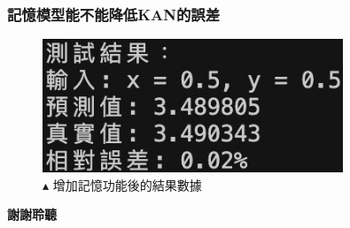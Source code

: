 \documentclass{beamer}
\begin{document}
\begin{frame}
    \frametitle{記憶模型能不能降低KAN的誤差}
    \begin{figure}
        \centering
        \begin{minipage}{\textwidth}
            \includegraphics[width=0.8\textwidth,keepaspectratio]{figures/增加記憶功能後的結果.jpg}
            \centering
            \caption*{$\blacktriangle$ 增加記憶功能後的結果數據}
        \end{minipage}
    \end{figure}
\end{frame}

\begin{frame}
    \begin{center}
        \Huge\textbf{謝謝聆聽}
    \end{center}
\end{frame}
\end{document}
